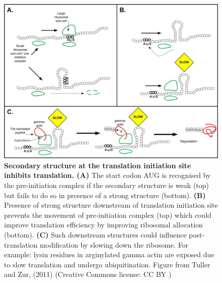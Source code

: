 \begin{figure}[htbp!]
\center
\includegraphics[width=1\textwidth]{chapters/Introduction/Figures/sec_str_rbs.jpg}
\caption[Secondary structure at the translation initiation site inhibits translation.]{\textbf{Secondary structure at the translation initiation site inhibits translation. (A) } The start codon AUG is recognised by the pre-initiation complex if the secondary structure is weak (top) but fails to do so in presence of a strong structure (bottom). \textbf{(B)} Presence of strong structure downstream of translation initiation site prevents the movement of pre-initiation complex (top) which could improve translation efficiency by improving ribosomal allocation (bottom). \textbf{(C)} Such downstream structures could influence post-translation modification by slowing down the ribosome. For example: lysin residues in arginylated gamma actin are exposed due to slow translation and undergo ubiquitination. Figure from Tuller and Zur, (2011) (Creative Commons license: CC BY ) }%
\label{fig:sec_str_rbs}
\end{figure}



